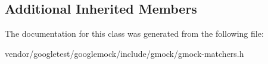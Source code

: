 \subsection*{Additional Inherited Members}


The documentation for this class was generated from the following file\+:\begin{DoxyCompactItemize}
\item 
vendor/googletest/googlemock/include/gmock/gmock-\/matchers.\+h\end{DoxyCompactItemize}
